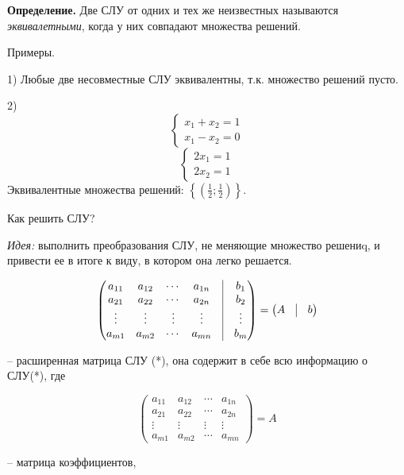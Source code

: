 \vspace{\baselineskip}
\textbf{Определение.} Две СЛУ от одних и тех же неизвестных называются \textit{эквивалетными}, когда у них совпадают множества решений.

\vspace{\baselineskip}
Примеры.

1) Любые две несовместные СЛУ эквивалентны, т.к. множество решений пусто.

2) 
\[
	\left\{
		\begin{aligned}
        x_1 + x_2 = 1 \\
        x_1 - x_2 = 0
		\end{aligned}
	\right. 
\]
\[
    \left\{
		\begin{aligned}
        2x_1 = 1 \\
        2x_2 = 1
		\end{aligned}
	\right.
\]
Эквивалентные множества решений: $ \left\{ \left( \frac{1}{2} ; \frac{1}{2} \right) \right\}$.

\vspace{\baselineskip}
Как решить СЛУ?

\textit{Идея:} выполнить преобразования СЛУ, не меняющие множество решениq, и привести ее в итоге к виду, в котором она легко решается.

\[
	\begin{pmatrix}
		a_{11} & a_{12} & \cdots & a_{1n} & \vrule & b_1 \\
		a_{21} & a_{22} & \cdots & a_{2n} & \vrule & b_2 \\
       \vdots & \vdots & \vdots& \vdots & \vrule & \vdots\\ 
       a_{m1} & a_{m2} & \cdots & a_{mn} & \vrule & b_m
	\end{pmatrix}
    =
    \begin{pmatrix}
    	A & \vrule & b
	\end{pmatrix}
\]

-- расширенная матрица СЛУ (*), она содержит в себе всю информацию о СЛУ(*), где 

\[
	\begin{pmatrix}
		a_{11} & a_{12} & \cdots & a_{1n} \\
		a_{21} & a_{22} & \cdots & a_{2n} \\
       \vdots & \vdots & \vdots& \vdots \\ 
       a_{m1} & a_{m2} & \cdots & a_{mn}
	\end{pmatrix}
    = A
\]

-- матрица коэффициентов,

